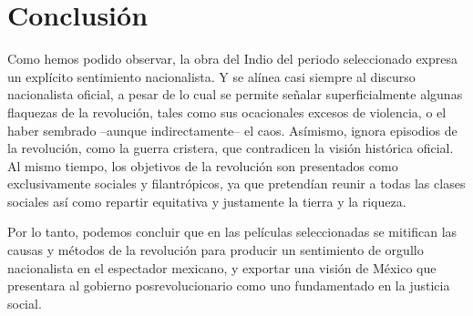 \section{Conclusión}
Como hemos podido observar, la obra del Indio del periodo seleccionado expresa un explícito sentimiento nacionalista. Y se alínea casi siempre al discurso nacionalista oficial, a pesar de lo cual se permite señalar superficialmente algunas flaquezas de la revolución, tales como sus ocacionales excesos de violencia, o el haber sembrado --aunque indirectamente-- el caos. Asímismo, ignora episodios  de la revolución, como la guerra cristera,  que contradicen la visión histórica oficial. Al mismo tiempo, los objetivos de la revolución son presentados como exclusivamente sociales y filantrópicos, ya que pretendían reunir a todas las clases sociales así como repartir equitativa y justamente la tierra y la riqueza.

Por lo tanto, podemos concluir que en las películas seleccionadas se mitifican  las causas y métodos de la revolución para producir un sentimiento de orgullo nacionalista en el espectador mexicano, y exportar una visión de México que presentara al gobierno posrevolucionario como uno fundamentado en la justicia social.



